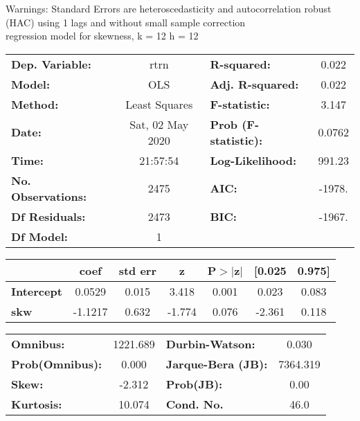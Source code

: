 Warnings: \newline
 [1] Standard Errors are heteroscedasticity and autocorrelation robust (HAC) using 1 lags and without small sample correction\\ 

regression model for skewness, k = 12 h = 12\begin{center}
\begin{tabular}{lclc}
\toprule
\textbf{Dep. Variable:}    &       rtrn       & \textbf{  R-squared:         } &     0.022   \\
\textbf{Model:}            &       OLS        & \textbf{  Adj. R-squared:    } &     0.022   \\
\textbf{Method:}           &  Least Squares   & \textbf{  F-statistic:       } &     3.147   \\
\textbf{Date:}             & Sat, 02 May 2020 & \textbf{  Prob (F-statistic):} &   0.0762    \\
\textbf{Time:}             &     21:57:54     & \textbf{  Log-Likelihood:    } &    991.23   \\
\textbf{No. Observations:} &        2475      & \textbf{  AIC:               } &    -1978.   \\
\textbf{Df Residuals:}     &        2473      & \textbf{  BIC:               } &    -1967.   \\
\textbf{Df Model:}         &           1      & \textbf{                     } &             \\
\bottomrule
\end{tabular}
\begin{tabular}{lcccccc}
                   & \textbf{coef} & \textbf{std err} & \textbf{z} & \textbf{P$> |$z$|$} & \textbf{[0.025} & \textbf{0.975]}  \\
\midrule
\textbf{Intercept} &       0.0529  &        0.015     &     3.418  &         0.001        &        0.023    &        0.083     \\
\textbf{skw}       &      -1.1217  &        0.632     &    -1.774  &         0.076        &       -2.361    &        0.118     \\
\bottomrule
\end{tabular}
\begin{tabular}{lclc}
\textbf{Omnibus:}       & 1221.689 & \textbf{  Durbin-Watson:     } &    0.030  \\
\textbf{Prob(Omnibus):} &   0.000  & \textbf{  Jarque-Bera (JB):  } & 7364.319  \\
\textbf{Skew:}          &  -2.312  & \textbf{  Prob(JB):          } &     0.00  \\
\textbf{Kurtosis:}      &  10.074  & \textbf{  Cond. No.          } &     46.0  \\
\bottomrule
\end{tabular}
\end{center}

